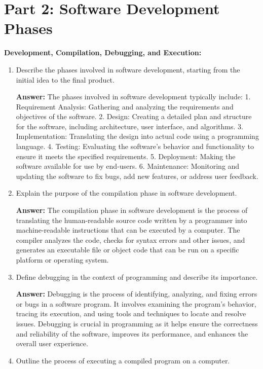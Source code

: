 \documentclass{article}
\begin{document}
\section*{Part 2: Software Development Phases}

\textbf{Development, Compilation, Debugging, and Execution:}
\begin{enumerate}
    \item Describe the phases involved in software development, starting from the initial idea to the final product.
    
    \textbf{Answer:}
    The phases involved in software development typically include:
    1. Requirement Analysis: Gathering and analyzing the requirements and objectives of the software.
    2. Design: Creating a detailed plan and structure for the software, including architecture, user interface, and algorithms.
    3. Implementation: Translating the design into actual code using a programming language.
    4. Testing: Evaluating the software's behavior and functionality to ensure it meets the specified requirements.
    5. Deployment: Making the software available for use by end-users.
    6. Maintenance: Monitoring and updating the software to fix bugs, add new features, or address user feedback.
    
    \item Explain the purpose of the compilation phase in software development.
    
    \textbf{Answer:}
    The compilation phase in software development is the process of translating the human-readable source code written by a programmer into machine-readable instructions that can be executed by a computer. The compiler analyzes the code, checks for syntax errors and other issues, and generates an executable file or object code that can be run on a specific platform or operating system.
    
    \item Define debugging in the context of programming and describe its importance.
    
    \textbf{Answer:}
    Debugging is the process of identifying, analyzing, and fixing errors or bugs in a software program. It involves examining the program's behavior, tracing its execution, and using tools and techniques to locate and resolve issues. Debugging is crucial in programming as it helps ensure the correctness and reliability of the software, improves its performance, and enhances the overall user experience.
    
    \item Outline the process of executing a compiled program on a computer.
    

\end{enumerate}
\end{document}

